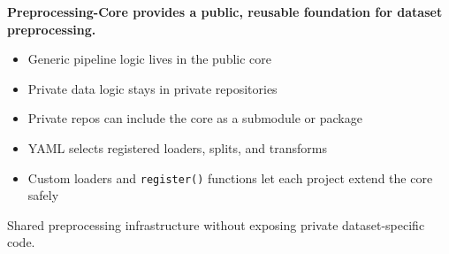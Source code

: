 \begin{frame}[plain]

  \vspace{16mm}
  {\small \textbf{Preprocessing-Core provides a public, reusable foundation for dataset preprocessing.}}\par

  \vspace{4mm}
  \begin{itemize}
    \item Generic pipeline logic lives in the public core
    \item Private data logic stays in private repositories
    \item Private repos can include the core as a submodule or package
    \item YAML selects registered loaders, splits, and transforms
    \item Custom loaders and \texttt{register()} functions let each project extend the core safely
  \end{itemize}

  \vspace{3mm}
  {\small Shared preprocessing infrastructure without exposing private dataset-specific code.}

  \slideheaderfooter
\end{frame}
